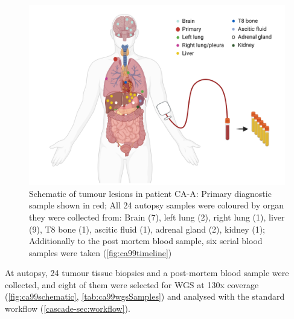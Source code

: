 \begin{figure}[htp]
\centering
\includegraphics[width=.99\linewidth]{Figures/CASCADE/CA99/CA-A_schematic_CA99_organColours}
\caption[Schematic of tumour lesions in patient CA-A]{Schematic of tumour lesions in patient CA-A: Primary diagnostic sample shown in red; All 24 autopsy samples were coloured by organ they were collected from: Brain (7), left lung (2), right lung (1), liver (9), T8 bone (1), ascitic fluid (1), adrenal gland (2), kidney (1); Additionally to the post mortem blood sample, six serial blood samples were taken (\protect\autoref{fig:ca99timeline})} \label{fig:ca99schematic}
\end{figure}


At autopsy, 24 tumour tissue biopsies and a post-mortem blood sample were collected, and eight of them were selected for WGS at 130x coverage (\autoref{fig:ca99schematic}, \autoref{tab:ca99wgsSamples}) and analysed with the standard workflow (\autoref{cascade-sec:workflow}).

